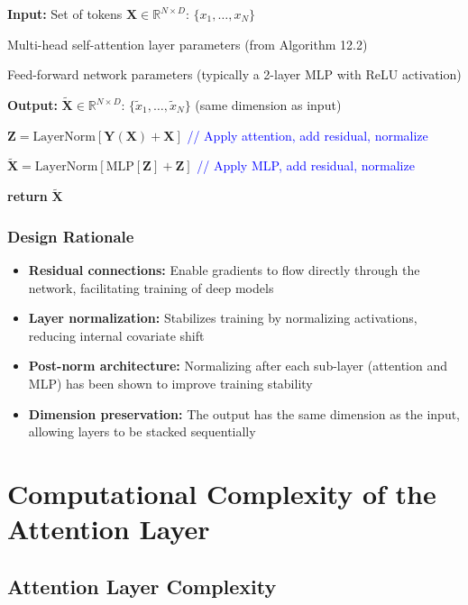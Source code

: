 \documentclass[11pt,a4paper]{article}
\theoremstyle{definition}
\theoremstyle{plain}
\theoremstyle{remark}
\begin{document}
\begin{tcolorbox}[colback=red!10!white,colframe=red!75!black,title=\textbf{Algorithm 12.3: Transformer layer}]
\textbf{Input:} Set of tokens $\mathbf{X} \in \mathbb{R}^{N \times D}$: $\{x_1, \ldots, x_N\}$

Multi-head self-attention layer parameters (from Algorithm 12.2)

Feed-forward network parameters (typically a 2-layer MLP with ReLU activation)

\textbf{Output:} $\tilde{\mathbf{X}} \in \mathbb{R}^{N \times D}$: $\{\tilde{x}_1, \ldots, \tilde{x}_N\}$ (same dimension as input)

\vspace{0.3cm}

$\mathbf{Z} = \text{LayerNorm}[\mathbf{Y}(\mathbf{X}) + \mathbf{X}]$ \textcolor{blue}{// Apply attention, add residual, normalize}

$\tilde{\mathbf{X}} = \text{LayerNorm}[\text{MLP}[\mathbf{Z}] + \mathbf{Z}]$ \textcolor{blue}{// Apply MLP, add residual, normalize}

\textbf{return} $\tilde{\mathbf{X}}$
\end{tcolorbox}

\subsubsection{Design Rationale}

\begin{itemize}
    \item \textbf{Residual connections:} Enable gradients to flow directly through the network, facilitating training of deep models
    \item \textbf{Layer normalization:} Stabilizes training by normalizing activations, reducing internal covariate shift
    \item \textbf{Post-norm architecture:} Normalizing after each sub-layer (attention and MLP) has been shown to improve training stability
    \item \textbf{Dimension preservation:} The output has the same dimension as the input, allowing layers to be stacked sequentially
\end{itemize}

\section{Computational Complexity of the Attention Layer}

\subsection{Attention Layer Complexity}
\end{document}
